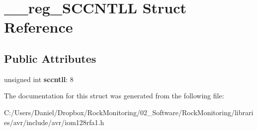 \hypertarget{struct____reg___s_c_c_n_t_l_l}{}\section{\+\_\+\+\_\+reg\+\_\+\+S\+C\+C\+N\+T\+LL Struct Reference}
\label{struct____reg___s_c_c_n_t_l_l}
\subsection*{Public Attributes}
\begin{DoxyCompactItemize}
\item 
unsigned int {\bfseries sccntll}\+: 8\hypertarget{struct____reg___s_c_c_n_t_l_l_a24dcf3e956df617203e1f775720109c4}{}\label{struct____reg___s_c_c_n_t_l_l_a24dcf3e956df617203e1f775720109c4}

\end{DoxyCompactItemize}


The documentation for this struct was generated from the following file\+:\begin{DoxyCompactItemize}
\item 
C\+:/\+Users/\+Daniel/\+Dropbox/\+Rock\+Monitoring/02\+\_\+\+Software/\+Rock\+Monitoring/libraries/avr/include/avr/iom128rfa1.\+h\end{DoxyCompactItemize}
